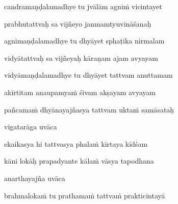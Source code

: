 candramaṇḍalamadhye tu jvālām agniṁ vicintayet\thinspace{\dandab} \dontdisplaylinenum

prabhutattvaḥ sa vijñeyo janmamtyuvināśanaḥ \veg\dontdisplaylinenum
{}

agnimaṇḍalamadhye tu dhyāyet sphaṭika nirmalam\thinspace{\dandab} \dontdisplaylinenum

vidyātattvaḥ sa vijñeyaḥ kāraṇam ajam avyayam \veg\dontdisplaylinenum
{}

vidyāmaṇḍalamadhye tu dhyāyet tattvam anuttamam\thinspace{\dandab} \dontdisplaylinenum

akīrtitam anaupamyaṁ śivam akṣayam avyayam \danda\dontdisplaylinenum

pañcamaṁ dhyānayajñasya tattvam uktaṁ samāsataḥ \veg\dontdisplaylinenum
{}

vigatarāga uvāca~{\dandab}\dontdisplaylinenum 

ekaikasya hi tattvasya phalaṁ kīrtaya kīdśam\thinspace{\danda} \dontdisplaylinenum

kāni lokāḥ prapadyante kālaṁ vāsya tapodhana \veg\dontdisplaylinenum
{}

anarthayajña uvāca~{\dandab}\dontdisplaylinenum 

brahmalokaṁ tu prathamaṁ tattvaṁ prakticintayā\thinspace{\danda} \dontdisplaylinenum

